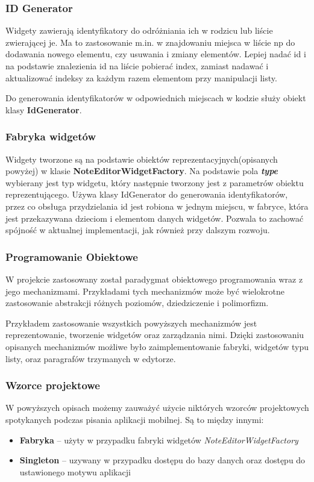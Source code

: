 \subsubsection{ID Generator}

Widgety zawierają identyfikatory do odróżniania ich w rodzicu lub liście zwierającej je. Ma to zastosowanie m.in. w znajdowaniu miejsca w liście np do dodawania nowego elementu, czy usuwania i zmiany elementów. Lepiej nadać id i na podstawie znalezienia id na liście pobierać index, zamiast nadawać i aktualizować indeksy za każdym razem elementom przy manipulacji listy.

Do generowania identyfikatorów w odpowiednich miejscach w kodzie służy obiekt klasy \textbf{IdGenerator}.

\subsubsection{Fabryka widgetów}

Widgety tworzone są na podstawie obiektów reprezentacyjnych(opisanych powyżej) w klasie \textbf{NoteEditorWidgetFactory}. Na podstawie pola \textbf{\textit{type}} wybierany jest typ widgetu, który następnie tworzony jest z parametrów obiektu reprezentującego. Używa klasy IdGenerator do generowania identyfikatorów, przez co obsługa przydzielania id jest robiona w jednym miejscu, w fabryce, która jest przekazywana dzieciom i elementom danych widgetów. Pozwala to zachować spójność w aktualnej implementacji, jak również przy dalszym rozwoju.

\subsubsection{Programowanie Obiektowe}

W projekcie zastosowany został paradygmat obiektowego programowania wraz z jego mechanizmami. Przykładami tych mechanizmów może być wielokrotne zastosowanie abstrakcji różnych poziomów, dziedziczenie i polimorfizm.

Przykładem zastosowanie wszystkich powyższych mechanizmów jest reprezentowanie, tworzenie widgetów oraz zarządzania nimi. 
Dzięki zastosowaniu opisanych mechanizmów możliwe było zaimplementowanie fabryki, widgetów typu listy, oraz paragrafów trzymanych w edytorze.

\subsubsection{Wzorce projektowe}

W powyższych opisach możemy zauważyć użycie niktórych wzorców projektowych spotykanych podczas pisania aplikacji mobilnej. Są to między innymi:

\begin{itemize}
    \item \textbf{Fabryka} -- użyty w przypadku fabryki widgetów \textit{NoteEditorWidgetFactory}
    \item \textbf{Singleton} -- uzywany w przypadku dostępu do bazy danych oraz dostępu do ustawionego motywu aplikacji
\end{itemize}
